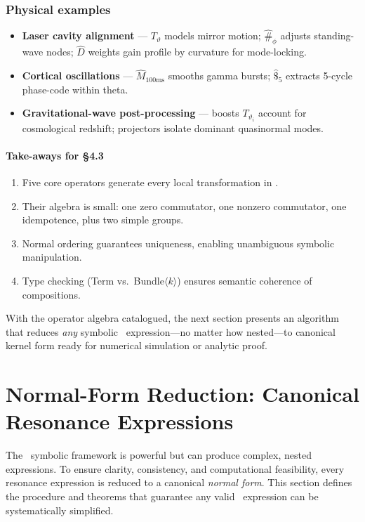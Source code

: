 \subsubsection{Physical examples}

\begin{itemize}[leftmargin=1.5em]
  \item \textbf{Laser cavity alignment} — \(T_{\vartheta}\) models mirror motion; \(\hat{\#}_{\phi}\) adjusts standing-wave nodes; \(\hat{D}\) weights gain profile by curvature for mode-locking.
  \item \textbf{Cortical oscillations} — \(\hat{M}_{100\mathrm{ms}}\) smooths gamma bursts; \(\hat{\$}_{5}\) extracts 5-cycle phase-code within theta.
  \item \textbf{Gravitational-wave post-processing} — boosts \(T_{\vartheta_i}\) account for cosmological redshift; projectors isolate dominant quasinormal modes.
\end{itemize}

\paragraph{Take-aways for §4.3}
\begin{enumerate}[leftmargin=1.5em,label=\arabic*.]
  \item Five core operators generate every local transformation in \RCM.
  \item Their algebra is small: one zero commutator, one nonzero commutator, one idempotence, plus two simple groups.
  \item Normal ordering guarantees uniqueness, enabling unambiguous symbolic manipulation.
  \item Type checking (Term vs.\ Bundle\(\langle k\rangle\)) ensures semantic coherence of compositions.
\end{enumerate}

With the operator algebra catalogued, the next section presents an algorithm that reduces \emph{any} symbolic \RCM\ expression—no matter how nested—to canonical kernel form ready for numerical simulation or analytic proof.

\section{Normal-Form Reduction: Canonical Resonance Expressions}

The \RCM\ symbolic framework is powerful but can produce complex, nested expressions. To ensure clarity, consistency, and computational feasibility, every resonance expression is reduced to a canonical \emph{normal form}. This section defines the procedure and theorems that guarantee any valid \RCM\ expression can be systematically simplified.

